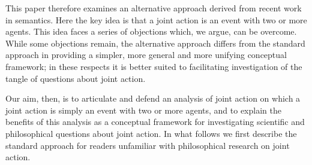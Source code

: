 \documentclass[12pt,a4paper]{extarticle}
\begin{document}
This paper therefore examines an alternative approach derived from recent work in semantics.
Here the key idea is that a joint action is an event with two or more agents.
This idea faces a series of objections which, we argue, can be overcome.
While some objections remain, the alternative approach differs from the standard approach in providing a simpler, more general and more unifying conceptual framework; in these respects it is better suited to facilitating investigation of the tangle of questions about joint action.

Our aim, then, is to articulate and defend an analysis of joint action on which a joint action is simply an event with two or more agents, and to explain the benefits of this analysis as a conceptual framework for investigating scientific and philosophical questions about joint action.
In what follows we first describe the standard approach for readers unfamiliar with philosophical research on joint action.
\end{document}
